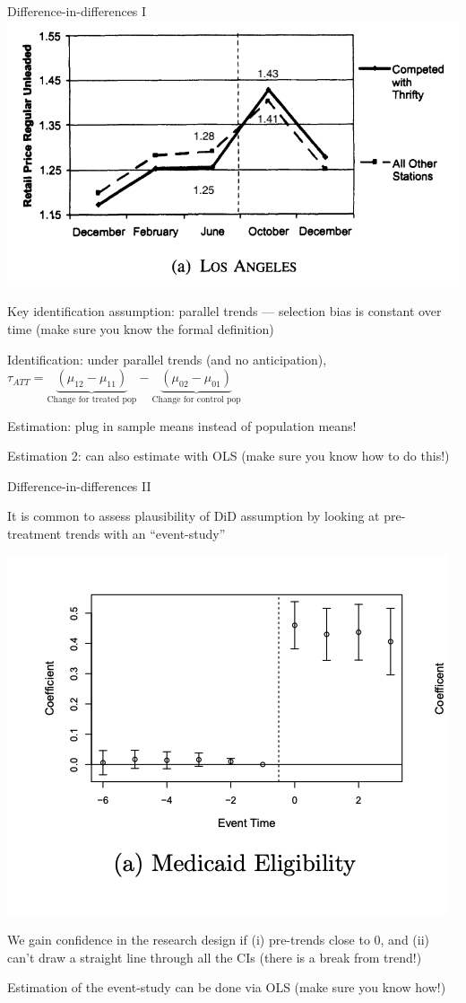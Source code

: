 \documentclass[11pt,english,handout]{beamer}
\newenvironment{wideitemize}{\itemize\addtolength{\itemsep}{10pt}}{\enditemize}
\begin{document}
\begin{frame}{Difference-in-differences I}
	\centering
	\includegraphics[width = 0.5\linewidth]{../Chapter6/hastings-event-study-w-labels}
	
	\begin{wideitemize}
		\item
		Key identification assumption: parallel trends --- selection bias is constant over time (make sure you know the formal definition)
		
		\pause
		\item
		Identification: under parallel trends (and no anticipation), $\tau_{ATT} = \underbrace{(\mu_{12} - \mu_{11})}_{\text{Change for treated pop}} - \underbrace{ (\mu_{02} - \mu_{01}) }_{\text{Change for control pop}}$
	
		\pause	
		\item
		Estimation: plug in sample means instead of population means!
		
		\pause
		\item
		Estimation 2: can also estimate with OLS (make sure you know how to do this!)
	\end{wideitemize}
\end{frame}

\begin{frame}{Difference-in-differences II }
	\begin{wideitemize}
		\item
		It is common to assess plausibility of DiD assumption by looking at pre-treatment trends with an ``event-study''
		
		\includegraphics[width = 0.5\linewidth]{../Chapter6/medicaid-eligibility}
		
		\item
		We gain confidence in the research design if (i) pre-trends close to 0, and (ii) can't draw a straight line through all the CIs (there is a break from trend!)
		
		\pause
		\item
		Estimation of the event-study can be done via OLS (make sure you know how!)
	\end{wideitemize}
\end{frame}
\end{document}
